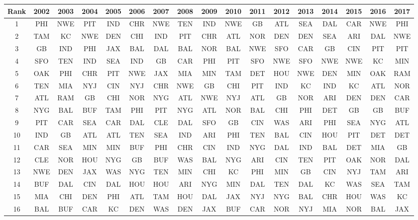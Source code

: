 \documentclass[11pt]{article}
\begin{document}
\begin{table}[!htb]
\begin{center}
\scriptsize
\begin{tabular}{|c|c|c|c|c|c|c|c|c|c|c|c|c|c|c|c|c|}
\hline
Rank & 2002 & 2003 & 2004 & 2005 & 2006 & 2007 & 2008 & 2009 & 2010 & 2011 & 2012 & 2013 & 2014 & 2015 & 2016 & 2017\\
 \hline
1 & PHI & NWE & PIT & IND & CHR & NWE & TEN & IND & NWE & GB & ATL & SEA & DAL & CAR & NWE & PHI\\
2 & TAM & KC & NWE & DEN & CHI & IND & PIT & CHR & ATL & NOR & DEN & DEN & SEA & ARI & DAL & NWE\\
3 & GB & IND & PHI & JAX & BAL & DAL & BAL & NOR & BAL & NWE & SFO & CAR & GB & CIN & PIT & PIT\\
4 & SFO & TEN & IND & SEA & IND & GB & CAR & PHI & PIT & SFO & NWE & SFO & NWE & NWE & KC & MIN\\
5 & OAK & PHI & CHR & PIT & NWE & JAX & MIA & MIN & TAM & DET & HOU & NWE & DEN & MIN & OAK & RAM\\
6 & TEN & MIA & NYJ & CIN & NYJ & CHR & NWE & GB & CHI & PIT & IND & KC & IND & KC & ATL & NOR\\
7 & ATL & RAM & GB & CHI & NOR & NYG & ATL & NWE & NYJ & ATL & GB & NOR & ARI & DEN & DEN & CAR\\
8 & NYG & BAL & BUF & TAM & PHI & PIT & NYG & ATL & NOR & BAL & CHI & PHI & DET & GB & GB & BUF\\
9 & PIT & CAR & SEA & CAR & DAL & CLE & DAL & SFO & GB & CIN & WAS & ARI & PHI & SEA & NYG & ATL\\
10 & IND & GB & ATL & ATL & TEN & SEA & IND & ARI & PHI & TEN & BAL & CIN & HOU & PIT & DET & DET\\
11 & CAR & SEA & MIN & MIN & BUF & PHI & CHR & CIN & IND & NYG & DAL & IND & BAL & DET & MIA & GB\\
12 & CLE & NOR & HOU & NYG & GB & BUF & WAS & BAL & NYG & ARI & CIN & TEN & PIT & OAK & NOR & DAL\\
13 & NWE & DEN & JAX & WAS & NYG & TEN & MIN & CHI & KC & PHI & MIN & GB & CIN & NYJ & TAM & ARI\\
14 & BUF & DAL & CIN & DAL & HOU & HOU & ARI & NYG & MIN & DAL & TEN & DAL & KC & WAS & SEA & TAM\\
15 & MIA & CHI & DEN & PHI & ATL & TAM & HOU & DAL & JAX & NYJ & NYG & BAL & CHR & HOU & WAS & KC\\
16 & BAL & BUF & CAR & KC & DEN & WAS & DEN & JAX & BUF & CAR & NOR & NYJ & MIA & NOR & BAL & JAX\\

\end{tabular}
\end{center}
\end{table}
\end{document}

